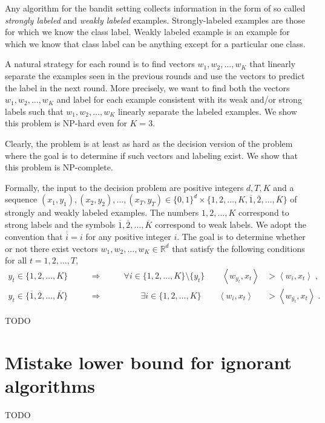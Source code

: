 \documentclass[12pt]{article}
\newcommand{\R}{\mathbb{R}}  %
\newcommand{\ip}[2]{\left\langle #1, #2 \right\rangle} %
\begin{document}
Any algorithm for the bandit setting collects information in the form of so
called \emph{strongly labeled} and \emph{weakly labeled} examples.
Strongly-labeled examples are those for which we know the class label. Weakly
labeled example is an example for which we know that class label can be anything
except for a particular one class.

A natural strategy for each round is to find vectors $w_1, w_2, \dots, w_K$ that
linearly separate the examples seen in the previous rounds and use the vectors
to predict the label in the next round. More precisely, we want to find both the
vectors $w_1, w_2, \dots, w_K$ and label for each example consistent with its
weak and/or strong labels such that $w_1, w_2, \dots, w_K$ linearly separate the
labeled examples. We show this problem is NP-hard even for $K=3$.

Clearly, the problem is at least as hard as the decision version of the problem
where the goal is to determine if such vectors and labeling exist. We show that
this problem is NP-complete.

Formally, the input to the decision problem are positive integers $d, T, K$ and
a sequence $(x_1, y_1), (x_2, y_2), \dots, (x_T, y_T) \in \{0,1\}^d \times
\{1,2,\dots,K, \overline{1}, \overline{2}, \dots, \overline{K}\}$ of strongly
and weakly labeled examples. The numbers $1,2,\dots,K$ correspond to strong
labels and the symbols $\overline{1}, \overline{2}, \dots, \overline{K}$
correspond to weak labels. We adopt the convention that $\overline{\overline{i}}
= i$ for any positive integer $i$. The goal is to determine whether or not there
exist vectors $w_1, w_2, \dots, w_K \in \R^d$ that satisfy the following
conditions for all $t=1,2,\dots,T$,
\begin{align*}
y_t \in \{1,2,\dots,K\} \qquad & \Longrightarrow \qquad & \forall i \in \{1,2,\dots,K\} \setminus \{y_t\} \qquad \ip{w_{y_t}}{x_t} & > \ip{w_i}{x_t} \; , \\
y_t \in \{\overline{1}, \overline{2},\dots, \overline{K}\} \qquad & \Longrightarrow & \qquad \exists i \in \{1,2,\dots,K\} \qquad \ip{w_i}{x_t} & > \ip{w_{\overline{y_t}}}{x_t} \; .
\end{align*}

TODO

\section{Mistake lower bound for ignorant algorithms}

TODO
\end{document}
